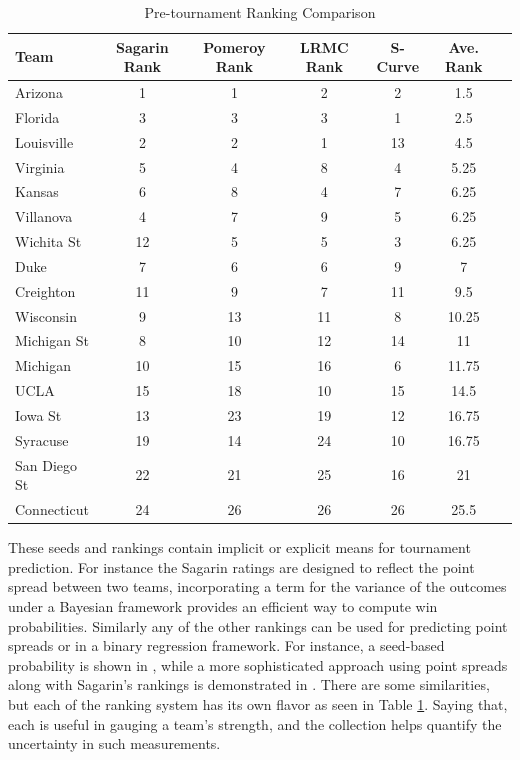 \documentclass[letterpaper,12pt]{article}
\begin{document}
\begin{table}[h!]
\caption{Pre-tournament Ranking Comparison}
\footnotesize
\centering
\begin{tabular}{l|ccccc|c}
  \hline
  \hline
 Team & Sagarin Rank &  Pomeroy Rank  & LRMC Rank & S-Curve& Ave. Rank  \\ 
  \hline
 Arizona         & 1  &1      & 2 & 2& 1.5  \\
 Florida          & 3  &3      &3 & 1& 2.5\\
 Louisville      & 2  &2      & 1 &13 & 4.5\\
 Virginia         & 5  &4       &8 & 4 &5.25\\
  Kansas         & 6  &8      & 4& 7 &6.25\\
 Villanova      & 4  &7       & 9 & 5 &6.25\\
 Wichita St    & 12 &5          &5 & 3 &6.25\\
 Duke             & 7  &6         &6 &9&7\\
  Creighton &  11 &   9   &7 &11& 9.5\\ 
 Wisconsin  &   9   &13     &  11 & 8 &10.25\\
 Michigan St & 8  &10   & 12& 14&11\\
 Michigan & 10 & 15&  16& 6 &11.75\\
 UCLA & 15& 18& 10 &15 &14.5\\
 Iowa St &13 &23  &19 &12 &16.75 \\
 Syracuse &19 &14   &24 &10 &16.75 \\
 San Diego St&22 &21   &25 &16 &21 \\
  \hline
  Connecticut & 24& 26& 26& 26&25.5\\
  \hline
   \hline
\end{tabular}
\label{tab:ranks}
\end{table}

These seeds and rankings contain implicit or explicit means for tournament prediction. For instance the Sagarin ratings are designed to reflect the point spread between two teams, incorporating a term for the variance of the outcomes under a Bayesian framework provides an efficient way to compute win probabilities. Similarly any of the other rankings can be used for predicting point spreads or in a binary regression framework. For instance, a seed-based probability is shown in \cite{schwertman1996}, while a more sophisticated approach using point spreads along with Sagarin's rankings is demonstrated in \cite{carlin1996}. There are some similarities, but each of the ranking system has its own flavor as seen in Table \ref{tab:ranks}. Saying that, each is useful in gauging a team's strength, and the collection helps quantify the uncertainty in such measurements.
\end{document}
